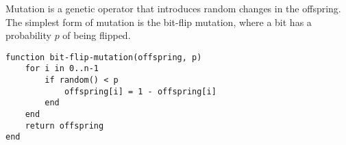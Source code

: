 Mutation is a genetic operator that introduces random changes in the offspring. The simplest form of mutation is the bit-flip mutation, where a bit has a probability $p$ of being flipped.

\begin{framed}
\begin{lstlisting}[caption=Bit-flip mutation]
function bit-flip-mutation(offspring, p)
	for i in 0..n-1
		if random() < p
			offspring[i] = 1 - offspring[i]
		end
	end
	return offspring
end
\end{lstlisting}
\end{framed}






